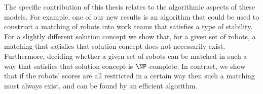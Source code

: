
The specific contribution of this thesis relates to the algorithmic aspects of these models. For example, one of our new results is an algorithm that could be used to construct a matching of robots into work teams that satisfies a type of stability. For a slightly different solution concept we show that, for a given set of robots, a matching that satisfies that solution concept does not necessarily exist. Furthermore, deciding whether a given set of robots can be matched in such a way that satisfies that solution concept is $\NP$-complete. In contrast, we show that if the robots' scores are all restricted in a certain way then such a matching must always exist, and can be found by an efficient algorithm. 











